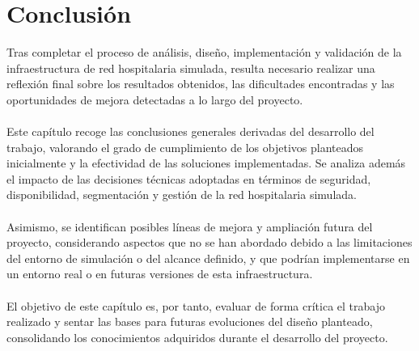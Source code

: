 
\chapter{Conclusión}\label{conclusion}
Tras completar el proceso de análisis, diseño, implementación y validación de la infraestructura de red hospitalaria simulada, resulta necesario realizar una reflexión final 
sobre los resultados obtenidos, las dificultades encontradas y las oportunidades de mejora detectadas a lo largo del proyecto.
\\ \\
Este capítulo recoge las conclusiones generales derivadas del desarrollo del trabajo, valorando el grado de cumplimiento de los objetivos planteados inicialmente y la 
efectividad de las soluciones implementadas. Se analiza además el impacto de las decisiones técnicas adoptadas en términos de seguridad, disponibilidad, segmentación y gestión 
de la red hospitalaria simulada.
\\ \\
Asimismo, se identifican posibles líneas de mejora y ampliación futura del proyecto, considerando aspectos que no se han abordado debido a las limitaciones del entorno de 
simulación o del alcance definido, y que podrían implementarse en un entorno real o en futuras versiones de esta infraestructura.
\\ \\
El objetivo de este capítulo es, por tanto, evaluar de forma crítica el trabajo realizado y sentar las bases para futuras evoluciones del diseño planteado, consolidando los 
conocimientos adquiridos durante el desarrollo del proyecto.

